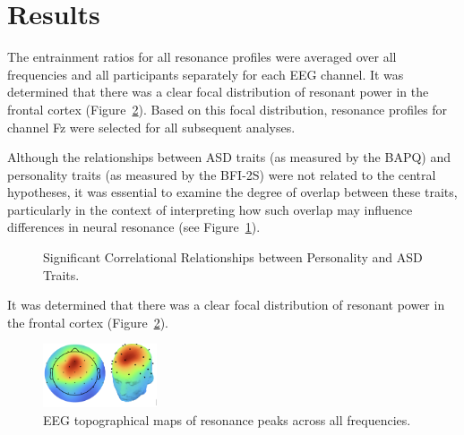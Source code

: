 \section{Results}
The entrainment ratios for all resonance profiles were averaged over all frequencies and all participants separately for each EEG channel. It was determined that there was a clear focal distribution of resonant power in the frontal cortex (Figure~\ref{fig:FocalDist}). Based on this focal distribution, resonance profiles for channel Fz were selected for all subsequent analyses.

Although the relationships between ASD traits (as measured by the BAPQ) and personality traits (as measured by the BFI-2S) were not related to the central hypotheses, it was essential to examine the degree of overlap between these traits, particularly in the context of interpreting how such overlap may influence differences in neural resonance (see Figure~\ref{fig:TikZmodel}).

\begin{figure}[ht!]
\centering
{}
\caption{\label{fig:TikZmodel} Significant Correlational Relationships between Personality and ASD Traits.}
\end{figure}

It was determined that there was a clear focal distribution of resonant power in the frontal cortex (Figure~\ref{fig:FocalDist}).

\begin{figure}[h!] 
\centering
\includegraphics[width=0.3\textwidth]{Focal Dist.png}
\caption{\label{fig:FocalDist}EEG topographical maps of resonance peaks across all frequencies.}
\end{figure}


